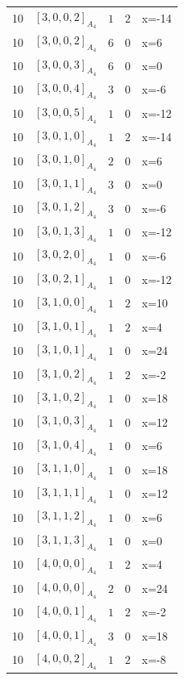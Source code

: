 \documentclass[11pt]{article}
\newcommand{\Dynkin}[1]{#1}
\begin{document}
\begin{longtable}{r l r r l}
10 & $\Dynkin{[3,0,0,2]_{A_4}}$ & $1$ & $2$ & x=-14\\
10 & $\Dynkin{[3,0,0,2]_{A_4}}$ & $6$ & $0$ & x=6\\
10 & $\Dynkin{[3,0,0,3]_{A_4}}$ & $6$ & $0$ & x=0\\
10 & $\Dynkin{[3,0,0,4]_{A_4}}$ & $3$ & $0$ & x=-6\\
10 & $\Dynkin{[3,0,0,5]_{A_4}}$ & $1$ & $0$ & x=-12\\
10 & $\Dynkin{[3,0,1,0]_{A_4}}$ & $1$ & $2$ & x=-14\\
10 & $\Dynkin{[3,0,1,0]_{A_4}}$ & $2$ & $0$ & x=6\\
10 & $\Dynkin{[3,0,1,1]_{A_4}}$ & $3$ & $0$ & x=0\\
10 & $\Dynkin{[3,0,1,2]_{A_4}}$ & $3$ & $0$ & x=-6\\
10 & $\Dynkin{[3,0,1,3]_{A_4}}$ & $1$ & $0$ & x=-12\\
10 & $\Dynkin{[3,0,2,0]_{A_4}}$ & $1$ & $0$ & x=-6\\
10 & $\Dynkin{[3,0,2,1]_{A_4}}$ & $1$ & $0$ & x=-12\\
10 & $\Dynkin{[3,1,0,0]_{A_4}}$ & $1$ & $2$ & x=10\\
10 & $\Dynkin{[3,1,0,1]_{A_4}}$ & $1$ & $2$ & x=4\\
10 & $\Dynkin{[3,1,0,1]_{A_4}}$ & $1$ & $0$ & x=24\\
10 & $\Dynkin{[3,1,0,2]_{A_4}}$ & $1$ & $2$ & x=-2\\
10 & $\Dynkin{[3,1,0,2]_{A_4}}$ & $1$ & $0$ & x=18\\
10 & $\Dynkin{[3,1,0,3]_{A_4}}$ & $1$ & $0$ & x=12\\
10 & $\Dynkin{[3,1,0,4]_{A_4}}$ & $1$ & $0$ & x=6\\
10 & $\Dynkin{[3,1,1,0]_{A_4}}$ & $1$ & $0$ & x=18\\
10 & $\Dynkin{[3,1,1,1]_{A_4}}$ & $1$ & $0$ & x=12\\
10 & $\Dynkin{[3,1,1,2]_{A_4}}$ & $1$ & $0$ & x=6\\
10 & $\Dynkin{[3,1,1,3]_{A_4}}$ & $1$ & $0$ & x=0\\
10 & $\Dynkin{[4,0,0,0]_{A_4}}$ & $1$ & $2$ & x=4\\
10 & $\Dynkin{[4,0,0,0]_{A_4}}$ & $2$ & $0$ & x=24\\
10 & $\Dynkin{[4,0,0,1]_{A_4}}$ & $1$ & $2$ & x=-2\\
10 & $\Dynkin{[4,0,0,1]_{A_4}}$ & $3$ & $0$ & x=18\\
10 & $\Dynkin{[4,0,0,2]_{A_4}}$ & $1$ & $2$ & x=-8\\

\end{longtable}
\end{document}
